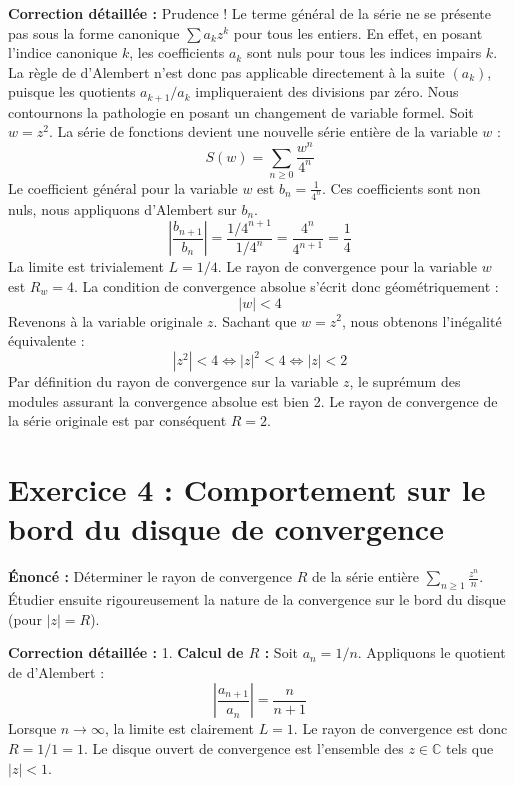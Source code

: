 \documentclass{report}
\begin{document}
\textbf{Correction détaillée :}
Prudence ! Le terme général de la série ne se présente pas sous la forme canonique $\sum a_k z^k$ pour tous les entiers. En effet, en posant l'indice canonique $k$, les coefficients $a_k$ sont nuls pour tous les indices impairs $k$.
La règle de d'Alembert n'est donc pas applicable directement à la suite $(a_k)$, puisque les quotients $a_{k+1}/a_k$ impliqueraient des divisions par zéro.
Nous contournons la pathologie en posant un changement de variable formel.
Soit $w = z^2$. La série de fonctions devient une nouvelle série entière de la variable $w$ :
$$ S(w) = \sum_{n \geq 0} \frac{w^n}{4^n} $$
Le coefficient général pour la variable $w$ est $b_n = \frac{1}{4^n}$. Ces coefficients sont non nuls, nous appliquons d'Alembert sur $b_n$.
$$ \left| \frac{b_{n+1}}{b_n} \right| = \frac{1/4^{n+1}}{1/4^n} = \frac{4^n}{4^{n+1}} = \frac{1}{4} $$
La limite est trivialement $L = 1/4$. Le rayon de convergence pour la variable $w$ est $R_w = 4$.
La condition de convergence absolue s'écrit donc géométriquement :
$$ |w| < 4 $$
Revenons à la variable originale $z$. Sachant que $w = z^2$, nous obtenons l'inégalité équivalente :
$$ |z^2| < 4 \iff |z|^2 < 4 \iff |z| < 2 $$
Par définition du rayon de convergence sur la variable $z$, le suprémum des modules assurant la convergence absolue est bien 2.
Le rayon de convergence de la série originale est par conséquent $R = 2$.

\newpage
\chapter*{Exercice 4 : Comportement sur le bord du disque de convergence}

\textbf{Énoncé :}
Déterminer le rayon de convergence $R$ de la série entière $\sum_{n \geq 1} \frac{z^n}{n}$. Étudier ensuite rigoureusement la nature de la convergence sur le bord du disque (pour $|z| = R$).

\textbf{Correction détaillée :}
1. \textbf{Calcul de $R$ :}
Soit $a_n = 1/n$. Appliquons le quotient de d'Alembert :
$$ \left| \frac{a_{n+1}}{a_n} \right| = \frac{n}{n+1} $$
Lorsque $n \to \infty$, la limite est clairement $L = 1$. Le rayon de convergence est donc $R = 1/1 = 1$.
Le disque ouvert de convergence est l'ensemble des $z \in \mathbb{C}$ tels que $|z| < 1$.
\end{document}
